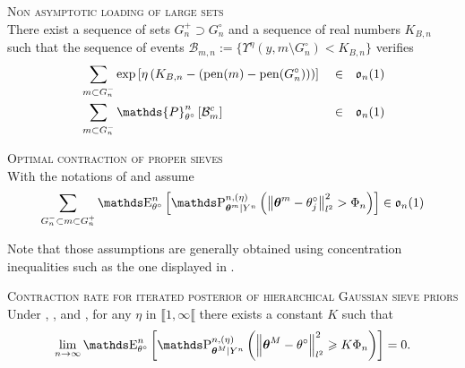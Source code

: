 \begin{as}{\textsc{Non asymptotic loading of large sets} \\}\label{AS_BAYES_STRATEGIES_EXPO_LARGESET}
There exist a sequence of sets $G^{+}_{n} \supset G^{\circ}_{n}$ and a sequence of real numbers $K_{B, n}$ such that the sequence of events $\mathcal{B}_{m, n} := \{\Upsilon^{\eta}(y, m \setminus G^{\circ}_{n}) < K_{B, n}\}$ verifies
\begin{alignat*}{3}
& \sum\limits_{m \subset G^{-}_{n}} \exp\left[\eta\left(K_{B, n} - (\pen(m) - \pen(G^{\circ}_{n}))\right)\right] && \in && \mathfrak{o}_{n}(1)\\
& \sum\limits_{m \subset G^{-}_{n}}\mathds{P}_{\theta^{\circ}}^{n}\left[ \mathcal{B}_{m}^{c}\right] && \in && \mathfrak{o}_{n}(1)\\
\end{alignat*}
\end{as}

\begin{as}{\textsc{Optimal contraction of proper sieves} \\}\label{AS_BAYES_STRATEGIES_EXPO_OPT}
With the notations of  and  assume
\[\sum\limits_{G^{-}_{n} \subset m \subset G^{+}_{n}} \E_{\theta^{\circ}}^{n}\left[\P_{\boldsymbol{\theta}^{m} \vert Y^{n}}^{n, (\eta)} \left(\left\Vert \boldsymbol{\theta}^{m} - \theta^{\circ}_{j} \right\Vert_{l^{2}}^{2} > \Phi_{n}\right)\right] \in \mathfrak{o}_{n}(1)\]
\end{as}

Note that those assumptions are generally obtained using concentration inequalities such as the one displayed in .

\begin{thm}{\textsc{Contraction rate for iterated posterior of hierarchical Gaussian sieve priors} \\}\label{THM_BAYES_STRATEGIES_EXPO}
Under , , and , for any $\eta$ in $\llbracket 1, \infty \llbracket$ there exists a constant $K$ such that
\[\lim\limits_{n \rightarrow \infty} \E_{\theta^{\circ}}^{n} \left[\P_{\boldsymbol{\theta}^{M} \vert Y^{n}}^{n, (\eta)}\left(\left\Vert \boldsymbol{\theta}^{M} - \theta^{\circ} \right\Vert_{l^{2}}^{2} \geq K \Phi_{n}\right)\right] = 0.\]
\end{thm}

